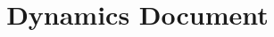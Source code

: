 \documentclass{article}
\title{\projectname Dynamics Document}
\date{\docdate}
\author{\authorname}
\begin{document}
\maketitle
\newpage

\tableofcontents
\newpage


\newpage

\printglossary

\glsaddall
\end{document}
